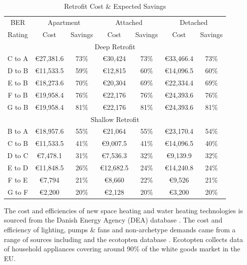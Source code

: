 \documentclass[gmd,manuscript]{copernicus}
\begin{document}
\begin{table}[ht]
 \centering
 \footnotesize
 \caption{Retrofit Cost \& Expected Savings}
 \begin{tabular}{ccccccc}
 \hline
 BER & \multicolumn{2}{c}{Apartment} & \multicolumn{2}{c}{Attached} & \multicolumn{2}{c}{Detached} \\ 
 Rating & Cost & Savings & Cost & Savings & Cost & Savings \\
 \hline
 \multicolumn{7}{c}{Deep Retrofit} \\
 \hline
 C to A & €27,381.6 & 73\% & €30,424 & 73\% & €33,466.4 & 73\% \\
 D to B	& €11,533.5 & 59\% & €12,815 & 60\% & €14,096.5 & 60\% \\
 E to B & €18,273.6 & 70\% & €20,304 & 69\% & €22,334.4 & 69\% \\
 F to B & €19,958.4 & 76\% & €22,176 & 76\% & €24,393.6 & 76\% \\
 G to B & €19,958.4 & 81\% & €22,176 & 81\% & €24,393.6 & 81\% \\
 \hline
 \multicolumn{7}{c}{Shallow Retrofit} \\[0.5ex]
 \hline
 B to A & €18,957.6 & 55\% & €21,064 & 55\% & €23,170.4 & 54\% \\
 C to B & €11,533.5 & 41\% & €9,007.5 & 41\% & €14,096.5 & 40\% \\
 D to C & €7,478.1 & 31\% & €7,536.3 & 32\% & €9,139.9 & 32\% \\
 E to D & €11,848.5 & 26\% & €12,682.5 & 24\% & €14,240.8 & 24\% \\
 F to E & €7,794 & 21\% & €8,660 & 22\% & €9,526 & 21\% \\
 G to F & €2,200 & 20\% & €2,128 & 20\% & €3,200 & 20\% \\ \hline
 \end{tabular}
 
 \label{Retrofit Expected Savings}
\end{table}

The cost and efficiencies of new space heating and water heating technologies is sourced from the Danish Energy Agency (DEA) database \citep{Energinet2018}. The cost and efficiency of lighting, pumps \& fans and non-archetype demands came from a range of sources including
\citep{SEAISustainableAuthorityofIreland2018} and the ecotopten database \citep{ecotopten}. Ecotopten collects data of household appliances covering around 90\% of the white goods market in the EU.
\end{document}
